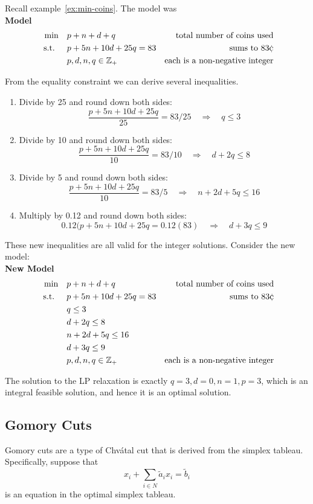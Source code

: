 \documentclass[../open-optimization/open-optimization.tex]{subfiles}
\begin{document}
\begin{example}{}{}
Recall example~\ref{ex:min-coins}.  The model was\\
\textbf{Model}
\begin{align*}
\min \quad & p + n + d + q & \text{ total number of coins used}\\
\text{ s.t. } \quad & p + 5n + 10d + 25 q = 83 & \text{sums to } 83 \cent\\
& p,d,n,q \in \Z_+ & \text{each is a non-negative integer}
\end{align*}

From the equality constraint we can derive several inequalities.
\begin{enumerate}
\item Divide by 25 and round down both sides:
\[
\frac{p + 5n + 10d + 25 q}{25} = 83/25 \quad \Rightarrow \quad q \leq 3 
\]
\item Divide by 10 and round down both sides:
\[
\frac{p + 5n + 10d + 25 q}{10} = 83/10 \quad \Rightarrow \quad d + 2q \leq 8 
\]
\item Divide by 5 and round down both sides:
\[
\frac{p + 5n + 10d + 25 q}{10} = 83/5 \quad \Rightarrow \quad n + 2d  + 5q \leq 16
\]
\item Multiply by 0.12 and round down both sides:
\[
0.12(p + 5n + 10d + 25 q = 0.12 (83) \quad \Rightarrow \quad d  + 3q \leq 9
\]
\end{enumerate}
These new inequalities are all valid for the integer solutions.  Consider the new model:\\

\textbf{New Model}
\begin{align*}
\min \quad & p + n + d + q & \text{ total number of coins used}\\
\text{ s.t. } \quad & p + 5n + 10d + 25 q = 83 & \text{sums to } 83 \cent\\
& q \leq 3\\
& d + 2q \leq 8 \\
& n + 2d  + 5q \leq 16\\
& d  + 3q \leq 9\\
& p,d,n,q \in \Z_+ & \text{each is a non-negative integer}
\end{align*}

The solution to the LP relaxation is exactly $q = 3, d = 0, n = 1, p = 3$, which is an integral feasible solution, and hence it is an optimal solution.
\end{example}


\subsection{Gomory Cuts}
Gomory cuts are a type of Chv\'atal cut that is derived from the simplex tableau.  Specifically, suppose that 
\begin{equation}
\label{eq:tableau-row}
 x_i + \sum_{i\in N} \tilde a_i x_i = \tilde b_i
\end{equation}
is an equation in the optimal simplex tableau. 
\end{document}
